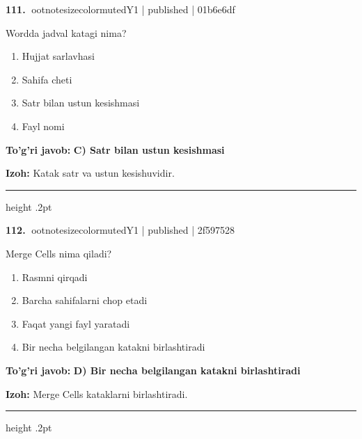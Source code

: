 \documentclass[10pt,a4paper]{article}
\begin{document}
\textbf{\color{ink}111.} {ootnotesizecolor{muted}Y1 | published | 01b6e6df}
\par
Wordda jadval katagi nima?
\begin{enumerate}[label=\Alph*),leftmargin=9mm]
\item Hujjat sarlavhasi
\item Sahifa cheti
\item Satr bilan ustun kesishmasi
\item Fayl nomi
\end{enumerate}
\begin{tcolorbox}[enhanced,breakable,colback=teal!4,colframe=teal!55!black,boxrule=0.45pt,arc=1.2mm,left=2.8mm,right=2.8mm,top=2mm,bottom=2mm]
\textbf{\color{teal}To'g'ri javob:} \textbf{C) Satr bilan ustun kesishmasi}
\par\smallskip
\textbf{Izoh:} Katak satr va ustun kesishuvidir.
\end{tcolorbox}
\vspace{2mm}\hrule height .2pt\vspace{2mm}

\textbf{\color{ink}112.} {ootnotesizecolor{muted}Y1 | published | 2f597528}
\par
Merge Cells nima qiladi?
\begin{enumerate}[label=\Alph*),leftmargin=9mm]
\item Rasmni qirqadi
\item Barcha sahifalarni chop etadi
\item Faqat yangi fayl yaratadi
\item Bir necha belgilangan katakni birlashtiradi
\end{enumerate}
\begin{tcolorbox}[enhanced,breakable,colback=teal!4,colframe=teal!55!black,boxrule=0.45pt,arc=1.2mm,left=2.8mm,right=2.8mm,top=2mm,bottom=2mm]
\textbf{\color{teal}To'g'ri javob:} \textbf{D) Bir necha belgilangan katakni birlashtiradi}
\par\smallskip
\textbf{Izoh:} Merge Cells kataklarni birlashtiradi.
\end{tcolorbox}
\vspace{2mm}\hrule height .2pt\vspace{2mm}
\end{document}

